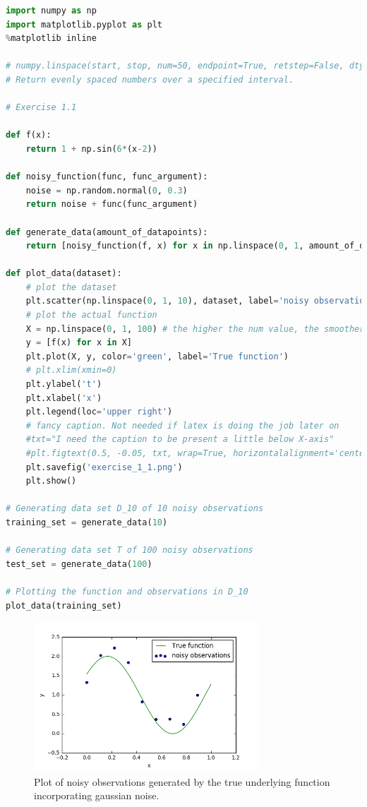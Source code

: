 \documentclass[a4paper]{article}
\begin{document}
\begin{lstlisting}[language=Python]
import numpy as np
import matplotlib.pyplot as plt
%matplotlib inline

# numpy.linspace(start, stop, num=50, endpoint=True, retstep=False, dtype=None)
# Return evenly spaced numbers over a specified interval.

# Exercise 1.1

def f(x):
	return 1 + np.sin(6*(x-2))

def noisy_function(func, func_argument):
	noise = np.random.normal(0, 0.3)
	return noise + func(func_argument)

def generate_data(amount_of_datapoints):
    return [noisy_function(f, x) for x in np.linspace(0, 1, amount_of_datapoints)]

def plot_data(dataset):
    # plot the dataset
    plt.scatter(np.linspace(0, 1, 10), dataset, label='noisy observations')
    # plot the actual function
    X = np.linspace(0, 1, 100) # the higher the num value, the smoother the function plot gets
    y = [f(x) for x in X]
    plt.plot(X, y, color='green', label='True function')
    # plt.xlim(xmin=0)
    plt.ylabel('t')
    plt.xlabel('x')
    plt.legend(loc='upper right')
    # fancy caption. Not needed if latex is doing the job later on
    #txt="I need the caption to be present a little below X-axis"
    #plt.figtext(0.5, -0.05, txt, wrap=True, horizontalalignment='center', fontsize=12)
    plt.savefig('exercise_1_1.png')
    plt.show()

# Generating data set D_10 of 10 noisy observations
training_set = generate_data(10)

# Generating data set T of 100 noisy observations
test_set = generate_data(100)

# Plotting the function and observations in D_10
plot_data(training_set)
\end{lstlisting}


\begin{figure}[H]

\begin{center}
\includegraphics[width=0.75\textwidth]{Images/exercise_1_1.png}
\caption{Plot of noisy observations generated by the true underlying function incorporating gaussian noise.}
\label{fig:1.1}
\end{center}
\end{figure}
\end{document}
